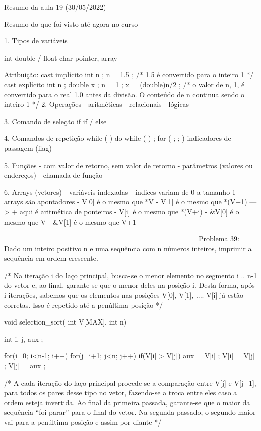 Resumo da aula 19 (30/05/2022)


Resumo do que foi visto até agora no curso
------------------------------------------

1. Tipos de variáveis

  int
  double / float
  char
  pointer, array

  Atribuição:
     cast implícito
         int  n ;
         n = 1.5 ;  /* 1.5 é convertido para o inteiro 1 */
     cast explícito
         int  n ;
         double x ;
         n = 1 ;
         x = (double)n/2 ;  /* o valor de n, 1, é convertido
                               para o real 1.0 antes da divisão.
                               O conteúdo de n continua sendo
                               o inteiro 1 */
2. Operações
  - aritméticas
  - relacionais
  - lógicas

3. Comando de seleção
  if
  if / else

4. Comandos de repetição
  while ( ) {  }  
  do {   } while ( ) ;
  for (  ;  ;  ) {  }
  indicadores de passagem (flag)

5. Funções
  - com valor de retorno, sem valor de retorno
  - parâmetros (valores ou endereços)
  - chamada de função

6. Arrays (vetores) - variáveis indexadas
  - índices variam de 0 a tamanho-1
  - arrays são apontadores
     - V[0] é o mesmo que *V
     - V[1] é o mesmo que *(V+1) ---> + aqui é aritmética de ponteiros
     - V[i] é o mesmo que *(V+i)
     - &V[0] é o mesmo que V
     - &V[1] é o mesmo que V+1



===================================
Problema 39: Dado um inteiro positivo n e uma sequência
com n números inteiros, imprimir a sequência em ordem
crescente.

/* Na iteração i do laço principal, busca-se
   o menor elemento no segmento i .. n-1 do
   vetor e, ao final, garante-se que o menor
   deles na posição i. Desta forma, após i
   iterações, sabemos que os elementos nas
   posições V[0], V[1], .... V[i] já estão
   corretas. Isso é repetido até a penúltima
   posição */
   
void selection_sort( int V[MAX], int n)
{
  int i, j, aux ;

  for(i=0; i<n-1; i++) {
    for(j=i+1; j<n; j++) {
      if(V[i] > V[j]) {
        aux = V[i] ;
        V[i] = V[j] ;
        V[j] = aux ;
      }
    }
  }  
}

/* A cada iteração do laço principal
   procede-se a comparação entre V[j] e V[j+1],
   para todos os pares desse tipo no vetor,
   fazendo-se a troca entre eles caso a ordem
   esteja invertida. Ao final da primeira passada,
   garante-se que o maior da sequência ``foi parar''
   para o final do vetor. Na segunda passado,
   o segundo maior vai para a penúltima posição
   e assim por diante */
   
